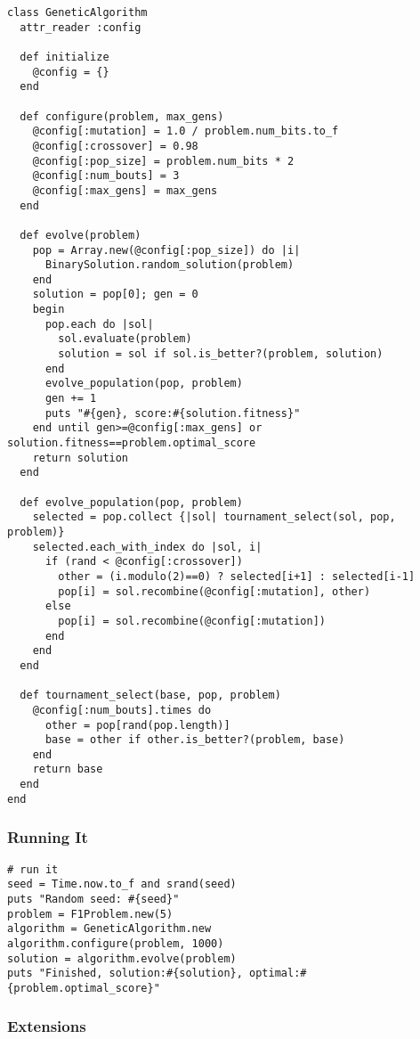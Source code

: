 \begin{lstlisting}[name=ga-algorithm]
class GeneticAlgorithm
  attr_reader :config
  
  def initialize
    @config = {}
  end
  
  def configure(problem, max_gens)    
    @config[:mutation] = 1.0 / problem.num_bits.to_f
    @config[:crossover] = 0.98
    @config[:pop_size] = problem.num_bits * 2
    @config[:num_bouts] = 3
    @config[:max_gens] = max_gens
  end
  
  def evolve(problem)    
    pop = Array.new(@config[:pop_size]) do |i| 
      BinarySolution.random_solution(problem)
    end
    solution = pop[0]; gen = 0
    begin
      pop.each do |sol| 
        sol.evaluate(problem) 
        solution = sol if sol.is_better?(problem, solution)
      end
      evolve_population(pop, problem)
      gen += 1
      puts "#{gen}, score:#{solution.fitness}"
    end until gen>=@config[:max_gens] or solution.fitness==problem.optimal_score
    return solution
  end
  
  def evolve_population(pop, problem)
    selected = pop.collect {|sol| tournament_select(sol, pop, problem)}
    selected.each_with_index do |sol, i|
      if (rand < @config[:crossover]) 
        other = (i.modulo(2)==0) ? selected[i+1] : selected[i-1]
        pop[i] = sol.recombine(@config[:mutation], other)
      else
        pop[i] = sol.recombine(@config[:mutation])
      end
    end
  end
  
  def tournament_select(base, pop, problem)
    @config[:num_bouts].times do    
      other = pop[rand(pop.length)]
      base = other if other.is_better?(problem, base)
    end
    return base
  end
end
\end{lstlisting}


\subsubsection{Running It}

\begin{lstlisting}[name=ga-algorithm]
# run it
seed = Time.now.to_f and srand(seed)
puts "Random seed: #{seed}"
problem = F1Problem.new(5)
algorithm = GeneticAlgorithm.new
algorithm.configure(problem, 1000)
solution = algorithm.evolve(problem)
puts "Finished, solution:#{solution}, optimal:#{problem.optimal_score}"
\end{lstlisting}


\subsubsection{Extensions}